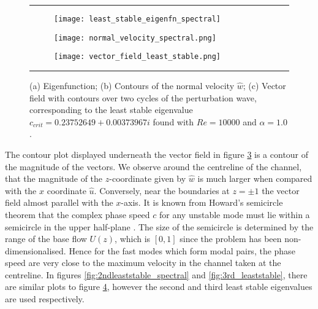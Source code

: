 \documentclass[a4paper, 12pt, twoside, openright]{article}
\numberwithin{equation}{section}
\begin{document}
\begin{figure}[H]
\rule{\linewidth}{1.5pt}
\begin{subfigure}[b]{0.5\textwidth}
\texttt{[image: least\_stable\_eigenfn\_spectral]}\hfill
\caption{\label{fig:least_stable_eigenfn_spectral}}
\end{subfigure}
\begin{subfigure}[b]{0.5\textwidth}
\texttt{[image: normal\_velocity\_spectral.png]}\hfill
\caption{\label{fig:normal_velocity_spectral}}
\end{subfigure}
\begin{subfigure}[b]{1.0\textwidth}
\texttt{[image: vector\_field\_least\_stable.png]}\hfill
\caption{\label{fig:vector_field_least_stable}}
\end{subfigure}
\caption{(a) Eigenfunction; (b) Contours of the normal velocity $\hat w$; (c) Vector field with contours over two cycles of the perturbation wave, corresponding to the least stable eigenvalue $c_{crit}=  0.23752649 + 0.00373967i$ found with $Re=10000$ and $\alpha=1.0$.\label{fig:spectral_leaststable}}
\rule{\linewidth}{1.5pt}
\end{figure}

The contour plot displayed underneath the vector field in figure  \ref{fig:vector_field_least_stable} is a contour of the magnitude of the vectors. We observe around the centreline of the channel, that the magnitude of the $z$-coordinate given by $\hat w$ is much larger when compared with the $x$ coordinate $\hat u$. Conversely, near the boundaries at $z=\pm1$ the vector field almost parallel with the $x$-axis. It is known from Howard's semicircle theorem that the complex phase speed $c$ for any unstable mode must lie within a semicircle in the upper half-plane \citep{Howard61}. The size of the semicircle is determined by the range of the base flow $U(z)$, which is $[0,1]$ since the problem has been non-dimensionalised. Hence for the fast modes which form modal pairs, the phase speed are very close to the maximum velocity in the channel taken at the centreline. In figures \ref{fig:2ndleaststable_spectral} and \ref{fig:3rd_leaststable}, there are similar plots to figure \ref{fig:spectral_leaststable}, however the second and third least stable eigenvalues are used respectively.  
\end{document}
